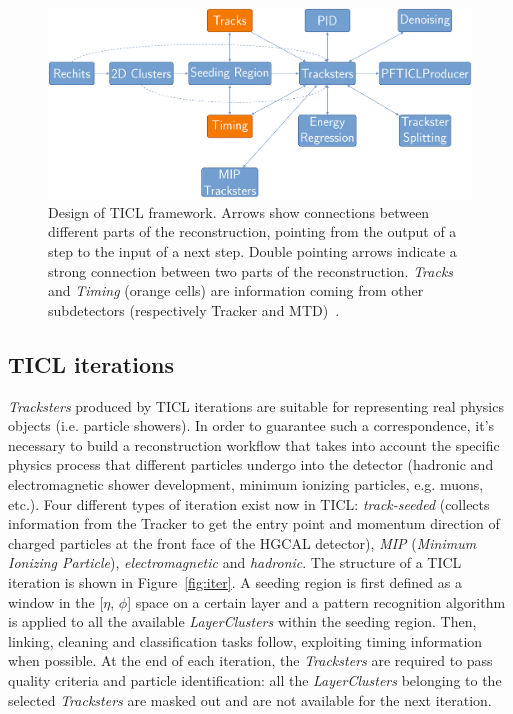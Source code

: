 \begin{figure}[tbp]
    \centering %
    \includegraphics[width=.9\textwidth]{chapters/HGCal/figures/chef/ticl.pdf} 
    \caption{\label{fig:ticl} Design of TICL framework. Arrows show connections between different parts of the reconstruction, pointing from the output of a step to the input of a next step. Double pointing arrows indicate a strong connection between two parts of the reconstruction. \emph{Tracks} and \emph{Timing} (orange cells) are information coming from other subdetectors (respectively Tracker and MTD)~\cite{9}.}
\end{figure}

\subsection{TICL iterations}
\label{sec:iter}
\emph{Tracksters} produced by TICL iterations are suitable for representing real physics objects (i.e. particle showers). In order to guarantee such a correspondence, it's necessary to build a reconstruction workflow that takes into account the specific physics process that different particles undergo into the detector (hadronic and electromagnetic shower development, minimum ionizing particles, e.g. muons, etc.). Four different types of iteration exist now in TICL: \emph{track-seeded} (collects information from the Tracker to get the entry point and momentum direction of charged particles at the front face of the HGCAL detector), \emph{MIP} (\emph{Minimum Ionizing Particle}), \emph{electromagnetic} and \emph{hadronic}. The structure of a TICL iteration is shown in Figure~\ref{fig:iter}. A seeding region is first defined as a window in the [$\eta$, $\phi$] space on a certain layer and a pattern recognition algorithm is applied to all the available \emph{LayerClusters} within the seeding region. Then, linking, cleaning and classification tasks follow, exploiting timing information when possible. At the end of each iteration, the \emph{Tracksters} are required to pass quality criteria and particle identification: all the \emph{LayerClusters} belonging to the selected \emph{Tracksters} are masked out and are not available for the next iteration.

